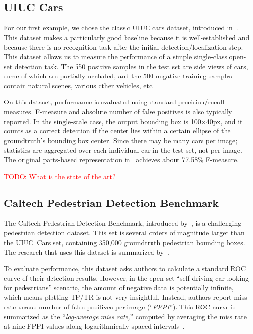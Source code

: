 \documentclass[10pt,twocolumn,letterpaper]{article}
\newcommand{\preliminary}[1]{\textcolor{red}{#1}}
\begin{document}
\subsection{UIUC Cars}\label{sec:uiuc-cars}
For our first example, we chose the classic UIUC cars dataset, introduced in~\cite{agarwal2002learning,agarwal2004learning}. This dataset makes a particularly good baseline because it is well-established and because there is no recognition task after the initial detection/localization step. This dataset allows us to measure the performance of a simple single-class open-set detection task. The 550 positive samples in the test set are side views of cars, some of which are partially occluded, and the 500 negative training samples contain natural scenes, various other vehicles, etc.

On this dataset, performance is evaluated using standard precision/recall measures. F-measure and absolute number of false positives is also typically reported. In the single-scale case, the output bounding box is 100$\times$40px, and it counts as a correct detection if the center lies within a certain ellipse of the groundtruth's bounding box center. Since there may be many cars per image; statistics are aggregated over each individual car in the test set, not per image. The original parts-based representation in~\cite{agarwal2002learning} achieves about 77.58\% F-measure.

\preliminary{TODO: What is the state of the art?}


\subsection{Caltech Pedestrian Detection Benchmark}
The Caltech Pedestrian Detection Benchmark, introduced by~\cite{dollarCVPR09peds}, is a challenging pedestrian detection dataset. This set is several orders of magnitude larger than the UIUC~Cars set, containing 350,000 groundtruth pedestrian bounding boxes. The research that uses this dataset is summarized by~\cite{Dollar2012PAMI}.

To evaluate performance, this dataset asks authors to calculate a standard ROC curve of their detection results. However, in the open set ``self-driving car looking for pedestrians'' scenario, the amount of negative data is potentially infinite, which means plotting TP/TR is not very insightful. Instead, authors report miss rate versus number of false positives per image (``\emph{FPPI}''). This ROC curve is summarized as the ``\emph{log-average miss rate,}'' computed by averaging the miss rate at nine FPPI values along logarithmically-spaced intervals~\cite{Dollar2012PAMI}.
\end{document}

